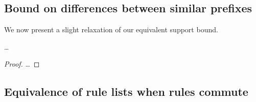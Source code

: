 \subsection{Bound on differences between similar prefixes}

We now present a slight relaxation of our equivalent support bound.

\begin{theorem}
\dots
\end{theorem}

\begin{proof}
\dots
\end{proof}

\subsection{Equivalence of rule lists when rules commute}

